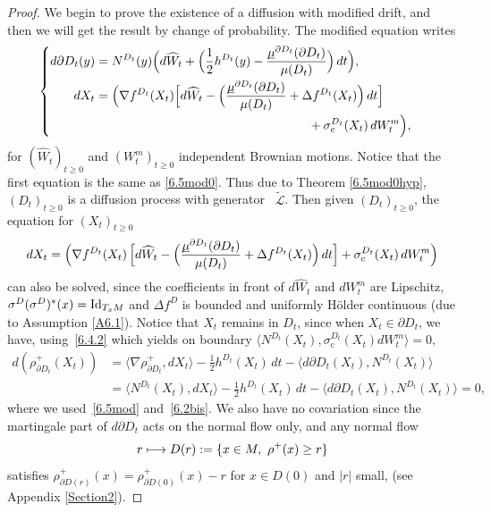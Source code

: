 \documentclass[JEP,XML,SOM,Unicode,NoFloatCountersInSection,published]{cedram}
\newcommand\mto{\mathchoice{\longmapsto}{\mapsto}{\mapsto}{\mapsto}}
\theoremstyle{plain}
\theoremstyle{definition}
\newcommand{\SL}{{\mathscr L}}
\newcommand{\usm}{{\underline{\smash{\mu}}}}
\let\f\frac
\let\D\Delta
\let\n\nabla
\let\s\sigma
\let\wi\widetilde
\begin{document}
\begin{proof}
We begin to prove the existence of a diffusion with modified drift, and then we will get the result by change of probability. The modified equation writes
\begin{equation}
\label{6.5mod}
\begin{cases}
\begin{aligned}
d\partial D_t(y)&=N^{D_t}(y)\Bigl(d\widehat W_t+ \Bigl(\f12 h^{D_t}(y)-\f{\usm^{\partial D_t}(\partial D_t)}{\mu(D_t)} \Bigr)\,dt \Bigr),\\
dX_t&= \Bigl(\n f^{D_t}(X_t) \Bigl[ d\widehat W_t-\Bigl(\f{\usm^{\partial D_t}(\partial D_t)}{\mu(D_t)}+\Delta f^{D_t}(X_t) \Bigr)\, dt \Bigr]\\&\hspace*{6cm}+ \sigma_{\mathrm c}^{D_t}(X_t)\, dW_t^m \Bigr),
\end{aligned}
\end{cases}
\end{equation}
for $(\widehat W_t)_{t\geq 0}$ and $(W_t^m)_{t\geq 0}$ independent Brownian motions.
Notice that the first equation is the same as \eqref{6.5mod0}. Thus due to Theorem \ref{6.5mod0hyp}, $(D_t)_{t\geq 0}$ is a diffusion process with generator ~$\wi\SL$.
Then given $(D_t)_{t\geq 0}$, the equation for $(X_t)_{t\geq 0}$
\begin{equation}
dX_t= \Bigl(\n f^{D_t}(X_t) \, \Bigl[ d\widehat W_t-\Bigl(\f{\usm^{\partial D_t}(\partial D_t)}{\mu(D_t)}+\Delta f^{D_t}(X_t) \Bigr)\, dt \Bigr]
+ \sigma_{\mathrm c}^{D_t}(X_t)\, dW_t^m \Bigr)
\end{equation}
can also be solved, since the coefficients in front of $d\widehat W_t$ and $dW_t^m$ are Lipschitz,
$\s^D(\s^D)^\ast(x)={\rm Id}_{T_xM}$ and $\D f^D$ is bounded and uniformly Hölder continuous (due to Assumption \ref{A6.1}).
Notice that $X_t$ remains in $D_t$, since when $X_t\in \partial D_t$, we have, using~\eqref{6.4.2} which yields on boundary $\langle N^{D_t}(X_t), \sigma_{\mathrm c}^{D_t}(X_t) dW_t^m\rangle=0$,
\begin{equation}%
\begin{split}
d(\rho^+_{\partial D_t}(X_t))&=\langle \n\rho^+_{\partial D_t},dX_t\rangle -\f{1}2h^{{D_t}}(X_t)\,dt-\langle d\partial D_t(X_t), N^{D_t}(X_t)\rangle\\
&=\langle N^{D_t}(X_t),dX_t\rangle -\f{1}2h^{{D_t}}(X_t)\,dt-\langle d\partial D_t(X_t), N^{D_t}(X_t)\rangle=0,
\end{split}
\end{equation}
where we used~\eqref{6.5mod} and~\eqref{6.2bis}. We also {have no covariation since} the martingale part of $d\partial D_t$ acts on the normal flow only, and any normal flow
\[
r\mto D(r):=\{x\in M,\ \rho^+(x)\ge r\}
\]
satisfies $\rho^+_{\partial D(r)}(x)=\rho^+_{\partial D(0)}(x)-r$ for $x\in D(0)$ and $|r|$ small, (see Appendix \ref{Section2}).


\end{proof}
\end{document}
